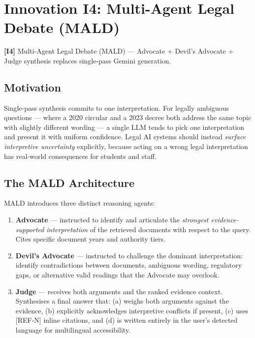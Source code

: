 \documentclass[12pt,a4paper]{article}
\newcommand{\innov}[2]{%
  \vspace{4pt}
  \noindent\colorbox{innovcolor!10}{\parbox{\dimexpr\linewidth-2\fboxsep}{%
    \small\textbf{\color{innovcolor}[I#1]} #2}}\vspace{4pt}}
\begin{document}
\section{Innovation I4: Multi-Agent Legal Debate (MALD)}
\label{sec:mald}

\innov{4}{Multi-Agent Legal Debate (MALD) — Advocate + Devil's Advocate + Judge
synthesis replaces single-pass Gemini generation.}

\subsection{Motivation}

Single-pass synthesis commits to one interpretation. For legally ambiguous questions
— where a 2020 circular and a 2023 decree both address the same topic with
slightly different wording — a single LLM tends to pick one interpretation and
present it with uniform confidence. Legal AI systems should instead \emph{surface
interpretive uncertainty} explicitly, because acting on a wrong legal interpretation
has real-world consequences for students and staff.

\subsection{The MALD Architecture}

MALD introduces three distinct reasoning agents:

\begin{enumerate}[leftmargin=*]
\item \textbf{Advocate} — instructed to identify and articulate the \emph{strongest
evidence-supported interpretation} of the retrieved documents with respect to the query.
Cites specific document years and authority tiers.

\item \textbf{Devil's Advocate} — instructed to challenge the dominant interpretation:
identify contradictions between documents, ambiguous wording, regulatory gaps,
or alternative valid readings that the Advocate may overlook.

\item \textbf{Judge} — receives both arguments and the ranked evidence context.
Synthesises a final answer that: (a) weighs both arguments against the evidence,
(b) explicitly acknowledges interpretive conflicts if present, (c) uses [REF-N]
inline citations, and (d) is written entirely in the user's detected language
for multilingual accessibility.
\end{enumerate}
\end{document}
